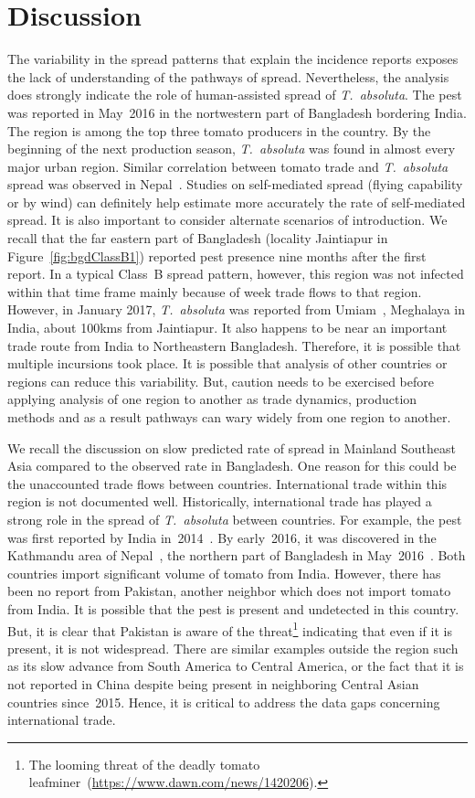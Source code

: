 \documentclass[11pt]{article}
\newcommand{\tuta}{\emph{T.~absoluta}}
\theoremstyle{definition}
\begin{document}
\section{Discussion}
The variability in the spread patterns that explain the incidence reports
exposes the lack of understanding of the pathways of spread.
Nevertheless, the analysis does strongly indicate the role of
human-assisted spread of \tuta{}. The pest was reported in May~2016 in the
nortwestern part of Bangladesh bordering India. The region is among the top
three tomato producers in the country. By the beginning of the next
production season, \tuta{} was found in almost every major urban region.
Similar correlation between tomato trade and \tuta{} spread was observed in
Nepal~\cite{venkatramanan2019modeling}. Studies on
self-mediated spread (flying capability or by wind) can definitely help
estimate more accurately the rate of self-mediated spread. It is also
important to consider alternate scenarios of introduction. We recall that
the far eastern part of Bangladesh (locality Jaintiapur in
Figure~\ref{fig:bgdClassB1}) reported pest presence nine months after the
first report. In a typical Class~B spread pattern, however, this region was
not infected within that time frame mainly because of week trade flows to
that region. However, in January 2017, \tuta{} was reported from
Umiam~\cite{sankarganesh2017}, Meghalaya in India, about 100kms from
Jaintiapur. It also happens to be near an important trade route from India
to Northeastern Bangladesh. Therefore, it is possible that multiple
incursions took place. It is possible that analysis of other countries or
regions can reduce this variability. But, caution needs to be exercised
before applying analysis of one region to another as trade dynamics,
production methods and as a result pathways can wary widely from one region
to another.

We recall the discussion on slow predicted rate of spread in Mainland
Southeast Asia compared to the observed rate in Bangladesh. One reason for
this could be the unaccounted trade flows between countries. International
trade within this region is not documented well. Historically,
international trade has played a strong role in the spread of \tuta{}
between countries. For example, the pest was first reported by India
in~2014~\cite{sridhar2014new,kalleshwaraswamy2015occurrence}. By
early~2016, it was discovered in the Kathmandu area of
Nepal~\cite{bajracharya2016first}, the northern part of Bangladesh in
May~2016~\cite{hossain2016first}. Both countries import significant volume
of tomato from India. However, there has been no report from Pakistan,
another neighbor which does not import tomato from India. It is possible
that the pest is present and undetected in this country. But, it is clear
that Pakistan is aware of the threat\footnote{The looming threat of the
deadly tomato leafminer~(\url{https://www.dawn.com/news/1420206}).}
indicating that even if it is present, it is not widespread. There are
similar examples outside the region such as its slow advance from South
America to Central America, or the fact that it is not reported in China
despite being present in neighboring Central Asian countries since~2015.
Hence, it is critical to address the data gaps concerning international
trade.
\end{document}

